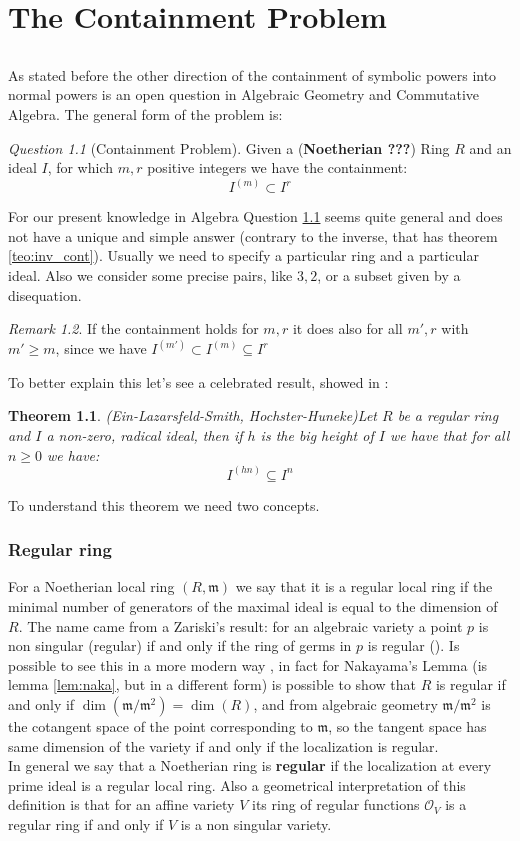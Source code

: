 \documentclass[a4wide]{book}
\theoremstyle{plain}
\newtheorem{teo}{Theorem}[section]
\theoremstyle{remark}
\newtheorem{rem}{Remark}
\newtheorem{que}[rem]{Question}
\theoremstyle{definition}
\newcommand{\mm}{\mathfrak{m}}
\newcommand{\cont}[2]{ I^{(#1)} \subseteq I^{#2}}
\newcounter{que}
\begin{document}
\chapter{The Containment Problem}
\section*{}
	As stated before the other direction of the containment of symbolic powers into normal powers is an open question in Algebraic Geometry and Commutative Algebra. The general form of the problem is:
	\begin{que}[Containment Problem] \label{que:cont}
		Given a (\textbf{Noetherian ???}) Ring $ R $ and an ideal $ I $, for which $ m,r $ positive integers we have the containment:
		$$ I^{(m)} \subset I^r $$
	\end{que}
	For our present knowledge in Algebra Question \ref{que:cont} seems quite general and does not have a unique and simple answer (contrary to the inverse, that has theorem \ref{teo:inv_cont}). Usually we need to specify a particular ring and a particular ideal. Also we consider some precise pairs, like $ 3,2 $, or a subset given by a disequation. 
	\begin{rem}
	If the containment holds for $ m,r $ it does also for all $ m' ,r $ with $ m'\geq m $, since we have $ I^{(m')} \subset \cont{m}{r} $
	\end{rem}
	To better explain this let's see a celebrated result, showed in \cite{HocHun02,EinLazSmi01}:
	\begin{teo}{(Ein-Lazarsfeld-Smith, Hochster-Huneke)}\label{teo:cont:bigh}
	Let $ R $ be a regular ring and $ I $ a non-zero, radical ideal, then if $ h $ is the big height of $ I $ we have that for all $ n \geq 0 $ we have:
	\[ \cont{hn}{n}\]	
	\end{teo} 
	
	To understand this theorem we need two concepts.
	\subsection{Regular ring}
	For a Noetherian local ring $ (R,\mm) $ we say that it is a regular local ring if the minimal number of generators of the maximal ideal is equal to the dimension of $ R $. The name came from a Zariski's result: for an algebraic variety a point $ p $ is non singular (regular) if and only if the ring of germs in $ p $ is regular (\cite{Zar40}). Is possible to see this in a more modern way , in fact for Nakayama's Lemma (is lemma \ref{lem:naka}, but in a different form) is possible to show that $ R $ is regular if and only if $ \dim(\mm / \mm^2 ) = \dim (R) $, and from algebraic geometry $ \mm /\mm^2 $ is the cotangent space of the point corresponding to $ \mm $, so the tangent space has same dimension of the variety if and only if the localization is regular.\\
	In general we say that a Noetherian ring is \textbf{regular} if the localization at every prime ideal is a regular local ring. Also a geometrical interpretation of this definition is that for an affine variety $ V $ its ring of regular functions $ \mathcal{O}_V $ is a regular ring if and only if $ V $ is a non singular variety. 
	
\end{document}
